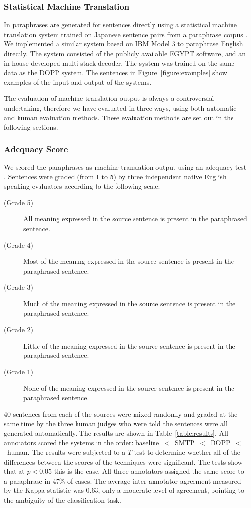 \subsubsection{Statistical Machine Translation}

In \cite{finch:fit2002} paraphrases are generated for sentences directly using a statistical machine translation 
system trained on Japanese sentence pairs from a paraphrase corpus \cite{Sugaya:02}. We implemented a similar system based on IBM Model 3 to 
paraphrase English directly. The system consisted of the publicly available EGYPT software,
and an in-house-developed multi-stack decoder. The system was trained on the same data 
as the DOPP system. The sentences in Figure~\ref{figure:examples} show examples
of the input and output of the systems. 

The evaluation of machine translation output is always a controversial undertaking, therefore we have 
evaluated in three ways, using both automatic and human evaluation methods. These evaluation
methods are set out in the following sections.

\subsubsection{Adequacy Score}
\label{sec:adequacy}

We scored the paraphrases as machine translation
output using an adequacy test \cite{Doyon:98}. Sentences were
graded (from 1 to 5) by three independent native English speaking evaluators according to the following scale:
\begin{description}
\item[(Grade 5)] All meaning expressed in the source sentence is
present in the paraphrased sentence.
\item[(Grade 4)] Most of the meaning expressed in the source sentence
is present in the paraphrased sentence.
\item[(Grade 3)] Much of the meaning expressed in the source
sentence is present in the paraphrased sentence.
\item[(Grade 2)] Little of the meaning expressed in the source
sentence is present in the paraphrased sentence.
\item[(Grade 1)] None of the meaning expressed in the source
sentence is present in the paraphrased sentence.
\end{description}


40 sentences from each of the sources were mixed randomly and graded at the same time by
the three human judges who were told the sentences were all 
generated automatically.  The results are shown in Table~\ref{table:results}.
All annotators scored the systems in the order: baseline~$<$~SMTP~$<$~DOPP~$<$~human.
The results were
subjected to a $T$-test to determine whether all of the differences between the scores of the techniques were
significant. The tests show that at $p < 0.05$ this is the case.
All three annotators assigned the same score to a paraphrase in 47\% of cases. The
average inter-annotator agreement measured by the Kappa statistic was 0.63, only a moderate
level of agreement, pointing to the ambiguity of the classification task. 

